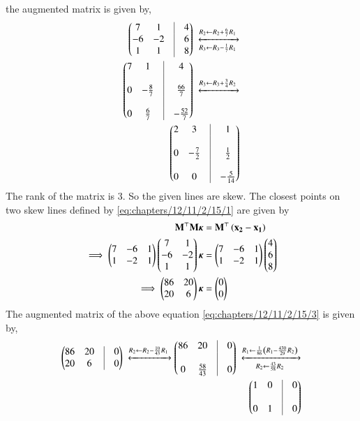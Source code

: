 the augmented matrix is given by,
\begin{align}
\myvec{7&1&\vrule&4\\-6&-2&\vrule&6\\1&1&\vrule&8}
\xleftrightarrow[R_3 \leftarrow R_3 - \frac{1}{7}R_1]{R_2 \leftarrow R_2 + \frac{6}{7}R_1}\\
\myvec{7&1&\vrule&4\\&&\vrule\\0&-\frac{8}{7}&\vrule&\frac{66}{7}\\&&\vrule\\0&\frac{6}{7}&\vrule&-\frac{52}{7}}
\xleftrightarrow{R_3 \leftarrow R_3 + \frac{3}{4}R_2}\\
\myvec{2&3&\vrule&1\\&&\vrule\\0&-\frac{7}{2}&\vrule&\frac{1}{2}\\&&\vrule\\0&0&\vrule&-\frac{5}{14}}
\end{align}
The rank of the matrix is 3. So the given lines are skew.
The closest points on two skew lines defined by \eqref{eq:chapters/12/11/2/15/1} are given by 
\begin{align}
\mathbf{M}^\top \mathbf{M}\bm{\kappa} &= \mathbf{M}^\top\left(\mathbf{x_2}-\mathbf{x_1}\right)\\
\implies \begin{pmatrix}7&-6&1\\1&-2&1\end{pmatrix} \begin{pmatrix}7&1\\-6&-2\\1&1\end{pmatrix}\bm{\kappa} &= \begin{pmatrix}7&-6&1\\1&-2&1\end{pmatrix} \begin{pmatrix}4\\6\\8\end{pmatrix}\\
\implies \begin{pmatrix}86&20\\20&6\end{pmatrix}\bm{\kappa} &= \begin{pmatrix}0\\0\end{pmatrix}
\label{eq:chapters/12/11/2/15/3}
\end{align}
The augmented matrix of the above equation \eqref{eq:chapters/12/11/2/15/3} is given by,
\begin{align}
\myvec{86&20&\vrule&0\\20&6&\vrule&0}
\xleftrightarrow{R_2 \leftarrow R_2 - \frac{10}{43}R_1}
\myvec{86&20&\vrule&0 \\&&\vrule\\ 0&\frac{58}{43}&\vrule&0}
\xleftrightarrow[R_2 \leftarrow \frac{43}{58}R_2]{R_1 \leftarrow \frac{1}{86} \brak{R_1 - \frac{430}{29}R_2}}\\
\myvec{1&0&\vrule&0 \\&&\vrule\\ 0&1&\vrule&0}
\end{align}
